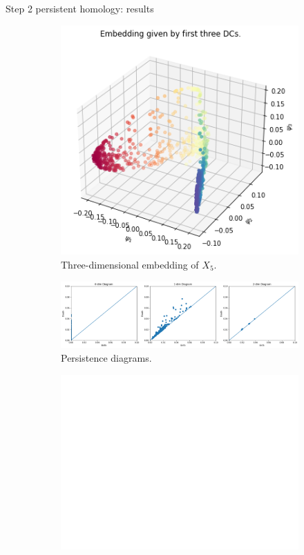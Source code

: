 \documentclass[xcolor={dvipsnames,svgnames}]{beamer}
\begin{document}
\begin{frame}{Step 2 persistent homology: results}
\begin{figure}[H]
\centering
\begin{subfigure}[b]{0.2\textwidth}
    \includegraphics[width=\textwidth]{figures/X5_embedding.png}
    \caption{Three-dimensional embedding of $X_5$.}
\end{subfigure}
\hfill
\begin{subfigure}[b]{0.75\textwidth}
    \includegraphics[width=\textwidth]{figures/X5_H0.png}
    \caption{Persistence diagrams.}
\end{subfigure}
\begin{subfigure}[b]{0.25\textwidth}
\includegraphics[width=\textwidth]{figures/white.png} 

\end{subfigure}
\end{figure}
\end{frame}
\end{document}
